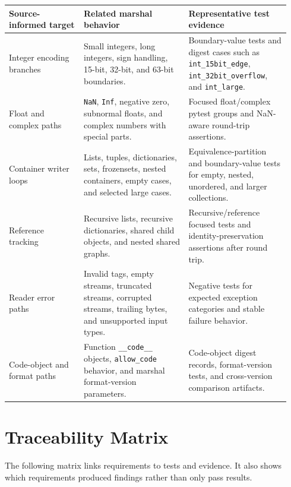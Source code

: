 \documentclass[10pt,a4paper]{article}
\begin{document}
\begin{longtable}{@{}L{0.25\linewidth}L{0.35\linewidth}L{0.34\linewidth}@{}}
\toprule
\textbf{Source-informed target} & \textbf{Related marshal behavior} & \textbf{Representative test evidence} \\
\midrule

Integer encoding branches &
Small integers, long integers, sign handling, 15-bit, 32-bit, and 63-bit boundaries. &
Boundary-value tests and digest cases such as \texttt{int\_15bit\_edge}, \texttt{int\_32bit\_overflow}, and \texttt{int\_large}. \\

Float and complex paths &
\texttt{NaN}, \texttt{Inf}, negative zero, subnormal floats, and complex numbers with special parts. &
Focused float/complex pytest groups and NaN-aware round-trip assertions. \\

Container writer loops &
Lists, tuples, dictionaries, sets, frozensets, nested containers, empty cases, and selected large cases. &
Equivalence-partition and boundary-value tests for empty, nested, unordered, and larger collections. \\

Reference tracking &
Recursive lists, recursive dictionaries, shared child objects, and nested shared graphs. &
Recursive/reference focused tests and identity-preservation assertions after round trip. \\

Reader error paths &
Invalid tags, empty streams, truncated streams, corrupted streams, trailing bytes, and unsupported input types. &
Negative tests for expected exception categories and stable failure behavior. \\

Code-object and format paths &
Function \texttt{\_\_code\_\_} objects, \texttt{allow\_code} behavior, and marshal format-version parameters. &
Code-object digest records, format-version tests, and cross-version comparison artifacts. \\

\bottomrule
\end{longtable}
\endgroup

\section{Traceability Matrix}

The following matrix links requirements to tests and evidence. It also shows which requirements produced findings rather than only pass results.
\end{document}
